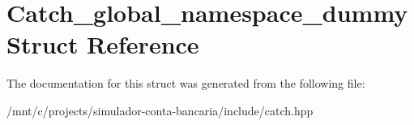\hypertarget{structCatch__global__namespace__dummy}{}\section{Catch\+\_\+global\+\_\+namespace\+\_\+dummy Struct Reference}
\label{structCatch__global__namespace__dummy}


The documentation for this struct was generated from the following file\+:\begin{DoxyCompactItemize}
\item 
/mnt/c/projects/simulador-\/conta-\/bancaria/include/catch.\+hpp\end{DoxyCompactItemize}
